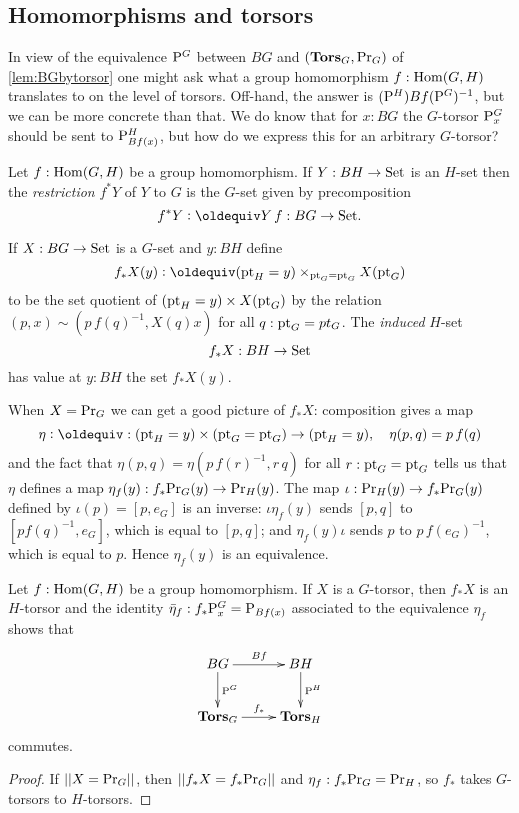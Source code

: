 \subsection{Homomorphisms and torsors}
\label{sec:homotor}
In view of the equivalence $\mathrm{P}_{}^G$ between $BG$ and $(\mathbf{Tors}_G,\mathrm{Pr}_{{G}})$ of \cref{lem:BGbytorsor} one might ask what a group homomorphism  $f:\mathrm{Hom}(G,H)$ translates to on the level of torsors.  Off-hand, the answer is $(\mathrm{P}_{}^H)Bf(\mathrm{P}_{}^G)^{-1}$, but we can be more concrete than that.  We do know that for $x:BG$ the $G$-torsor $\mathrm{P}_{x}^G$ should be sent to $\mathrm{P}_{Bf(x)}^H$, but how do we express this for an arbitrary $G$-torsor?
\begin{definition}
  \label{def:restrictandinduce}
  Let $f:\mathrm{Hom}(G,H)$ be a group homomorphism.  If $Y:BH\to\mathord{\mathrm{Set}}$ is an $H$-set then the \emph{restriction} $f^*Y$ of $Y$ to $G$ is the $G$-set given by precomposition 
$$f^*Y\defequi Y\, f:BG\to\Set.$$  

If $X:BG\to\mathord{\mathrm{Set}}$ is a $G$-set and $y:BH$ define 
$$f_*X(y)\defequi(\pt_H=y)\times_{\pt_G=\pt_G}X(\pt_G)$$ to be the set quotient of $({\mathord{\mathrm{pt}}}_H=y)\times X({\mathord{\mathrm{pt}}}_G)$ by the relation $(p,x)\sim(p\, f(q)^{-1},X(q)x)$ for all $q:{\mathord{\mathrm{pt}}}_G=pt_G$.  The \emph{induced} $H$-set 
$$f_*X:BH\to\mathord{\mathrm{Set}}$$ has value at $y:BH$ the set $f_*X(y)$.
\end{definition}
When $X=\mathrm{Pr}_{{G}}$ we can get a good picture of $f_*X$:  composition gives a map
$$\eta\defequi:(\pt_H=y)\times (\pt_G=\pt_G)\to (\pt_H=y),\quad \eta(p,q)=p\,f(q)$$
and the fact that $\eta(p,q)=\eta(p\,f(r)^{-1},r\,q)$ for all $r:{\mathord{\mathrm{pt}}}_G={\mathord{\mathrm{pt}}}_G$ tells us that $\eta$ defines a map $\eta_f(y):f_*\mathrm{Pr}_{{G}}(y)\to\mathrm{Pr}_{{H}}(y)$.  
The map $\iota:\mathrm{Pr}_{{H}}(y)\to f_*\mathrm{Pr}_{{G}}(y)$ defined by $\iota(p)=[p,e_G]$ is an inverse: $\iota\eta_f(y)$ sends $[p,q]$ to $[pf(q)^{-1},e_G]$, which is equal to $[p,q]$; and $\eta_f(y)\iota$ sends $p$ to $p\,f(e_G)^{-1}$, which is equal to $p$.  Hence $\eta_f(y)$ is an equivalence.
\begin{lemma}
  \label{lem:inducedtorsor}
   Let $f:\mathrm{Hom}(G,H)$ be a group homomorphism.  
If $X$ is a $G$-torsor, then $f_*X$ is an $H$-torsor and the identity $\bar{\eta}_f:f_*\mathrm{P}_{x}^G=\mathrm{P}_{Bf(x)}$ associated to the equivalence $\eta_f$ shows that  
$$\xymatrix{BG\ar[r]^{Bf}\ar[d]^{\pathsp{}^G}&BH\ar[d]^{\pathsp{}^H}\\
\typetorsor_G\ar[r]^{f_*}&\typetorsor_H}$$ 
commutes.
\end{lemma}
\begin{proof}
  If $||X=\mathrm{Pr}_{{G}}||$, then $||f_*X=f_*\mathrm{Pr}_{{G}}||$ and $\eta_f:f_*\mathrm{Pr}_{{G}}=\mathrm{Pr}_{{H}}$, so $f_*$ takes $G$-torsors to $H$-torsors.
\end{proof}
